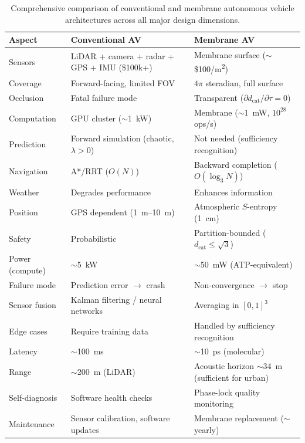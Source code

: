 \documentclass[12pt]{article}
\theoremstyle{definition}
\theoremstyle{remark}
\newcommand{\dcat}{d_{\mathrm{cat}}}
\begin{document}
\begin{table}[H]
\centering
\caption{Comprehensive comparison of conventional and membrane autonomous vehicle architectures across all major design dimensions.}
\label{tab:comparison}
\small
\begin{tabularx}{\textwidth}{@{}p{2.8cm}p{4.5cm}X@{}}
\toprule
\textbf{Aspect} & \textbf{Conventional AV} & \textbf{Membrane AV} \\
\midrule
Sensors & LiDAR + camera + radar + GPS + IMU (\$100k+) & Membrane surface ($\sim$\$100/\si{m^2}) \\
Coverage & Forward-facing, limited FOV & $4\pi$ steradian, full surface \\
Occlusion & Fatal failure mode & Transparent ($\partial\dcat/\partial\tau = 0$) \\
Computation & GPU cluster ($\sim$\SI{1}{kW}) & Membrane ($\sim$\SI{1}{mW}, $10^{28}$ ops/s) \\
Prediction & Forward simulation (chaotic, $\lambda > 0$) & Not needed (sufficiency recognition) \\
Navigation & A*/RRT ($O(N)$) & Backward completion ($O(\log_3 N)$) \\
Weather & Degrades performance & Enhances information \\
Position & GPS dependent (\SI{1}{m}--\SI{10}{m}) & Atmospheric $S$-entropy (\SI{1}{cm}) \\
Safety & Probabilistic & Partition-bounded ($\dcat \leq \sqrt{3}$) \\
Power (compute) & $\sim$\SI{5}{kW} & $\sim$\SI{50}{mW} (ATP-equivalent) \\
Failure mode & Prediction error $\to$ crash & Non-convergence $\to$ stop \\
Sensor fusion & Kalman filtering / neural networks & Averaging in $[0,1]^3$ \\
Edge cases & Require training data & Handled by sufficiency recognition \\
Latency & $\sim$\SI{100}{ms} & $\sim$\SI{10}{ps} (molecular) \\
Range & $\sim$\SI{200}{m} (LiDAR) & Acoustic horizon $\sim$\SI{34}{m} (sufficient for urban) \\
Self-diagnosis & Software health checks & Phase-lock quality monitoring \\
Maintenance & Sensor calibration, software updates & Membrane replacement ($\sim$yearly) \\
\bottomrule
\end{tabularx}
\end{table}
\end{document}
